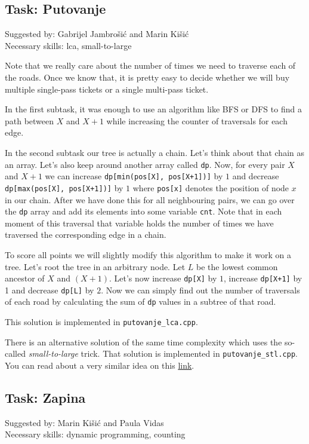 \documentclass[a4paper]{article}
\begin{document}
\clearpage

\subsection*{Task: Putovanje}
\textsf{Suggested by: Gabrijel Jambrošić and Marin Kišić}\\
\textsf{Necessary skills: lca, small-to-large}

Note that we really care about the number of times we need to traverse
each of the roads. Once we know that, it is pretty easy to decide whether
we will buy multiple single-pass tickets or a single multi-pass ticket.

In the first subtask, it was enough to use an algorithm like BFS or DFS to
find a path between $X$ and $X+1$ while increasing the counter of traversals
for each edge.

In the second subtask our tree is actually a chain. Let's think about that
chain as an array. Let's also keep around another array called \texttt{dp}.
Now, for every pair $X$ and $X+1$ we can increase \texttt{dp[min(pos[X], pos[X+1])]}
by $1$ and decrease \texttt{dp[max(pos[X], pos[X+1])]} by $1$ where \texttt{pos[x]}
denotes the position of node $x$ in our chain. After we have done this for all
neighbouring pairs, we can go over the \texttt{dp} array and add its elements
into some variable \texttt{cnt}. Note that in each moment of this traversal that
variable holds the number of times we have traversed the corresponding edge
in a chain.

To score all points we will slightly modify this algorithm to make it work
on a tree. Let's root the tree in an arbitrary node. Let $L$ be the lowest
common ancestor of $X$ and $(X+1)$. Let's now increase \texttt{dp[X]} by
$1$, increase \texttt{dp[X+1]} by 1 and decrease \texttt{dp[L]} by $2$.
Now we can simply find out the number of traversals of each road by calculating
the sum of \texttt{dp} values in a subtree of that road.

This solution is implemented in \texttt{putovanje\_lca.cpp}.

There is an alternative solution of the same time complexity which uses the
so-called \textit{small-to-large} trick. That solution is implemented in
\texttt{putovanje\_stl.cpp}. You can read about a very similar idea
on this \href{https://codeforces.com/blog/entry/72017#comment-563190}{link}.


\subsection*{Task: Zapina}
\textsf{Suggested by: Marin Kišić and Paula Vidas}\\
\textsf{Necessary skills: dynamic programming, counting}
\end{document}
